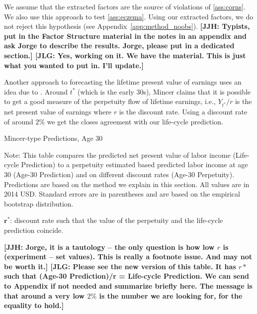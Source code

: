 We assume that the extracted factors are the source of violations of \eqref{ass:corns}. We also use this approach to test \ref{ass:eczema}. Using our extracted factors, we do not reject this hypothesis (see Appendix~\ref{app:method_noobs}). \textbf{[JJH: Typists, put in the Factor Structure material in the notes in an appendix and ask Jorge to describe the results. Jorge, please put in a dedicated section.]  [JLG: Yes, working on it. We have the material. This is just what you wanted to put in. I'll update.]}

Another approach to forecasting the lifetime present value of earnings uses an idea due to \citet{Mincer_1974_schooling}. Around $t^*$ (which is the early 30s), Mincer claims that it is possible to get a good measure of the perpetuity flow of lifetime earnings, i.e., $Y_{t^*}/r$ is the net present value of earnings where $r$ is the discount rate. Using a discount rate of around 2\% we get the closes agreement with our life-cycle prediction.

\begin{table}[!htbp]
\begin{threeparttable}
\caption{Mincer-type Predictions, Age 30}\label{tab:mincerpred}
\scriptsize
\centering

\begin{tablenotes}
\footnotesize
\item Note: This table compares the predicted net present value of labor income (Life-cycle Prediction) to a perpetuity estimated based predicted labor income at age 30 (Age-30 Prediction) and on different discount rates (Age-30 Perpetuity). Predictions are based on the method we explain in this section. All values are in 2014 USD. Standard errors are in parentheses and are based on the empirical bootstrap distribution.\\
\item $\bm{r^*}$: discount rate such that the value of the perpetuity and the life-cycle prediction coincide.
\end{tablenotes}
\end{threeparttable}
\end{table}

\textbf{[JJH: Jorge, it is a tautology -- the only question is how low $r$ is (experiment -- set values). This is really a footnote issue. And may not be worth it.] [JLG: Please see the new version of this table. It has $r*$ such that (Age-30 Prediction)/r = Life-cycle Prediction. We can send to Appendix if not needed and summarize briefly here. The message is that around a very low $2\%$ is the number we are looking for, for the equality to hold.]}

